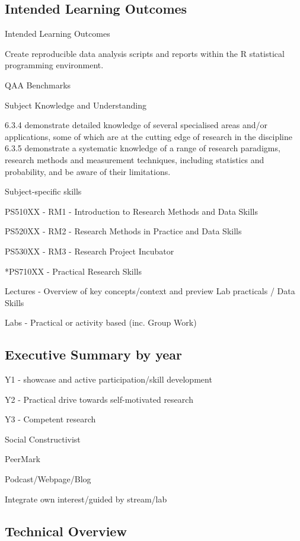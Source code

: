 \documentclass[
  11pt,
  letterpaper,
  oneside,
  open=any]{scrbook}
\begin{document}
\hypertarget{intended-learning-outcomes}{%
\subsection{Intended Learning
Outcomes}\label{intended-learning-outcomes}}

Intended Learning Outcomes

Create reproducible data analysis scripts and reports within the R
statistical programming environment.

QAA Benchmarks

Subject Knowledge and Understanding

6.3.4 demonstrate detailed knowledge of several specialised areas and/or
applications, some of which are at the cutting edge of research in the
discipline 6.3.5 demonstrate a systematic knowledge of a range of
research paradigms, research methods and measurement techniques,
including statistics and probability, and be aware of their limitations.

Subject-specific skills

PS510XX - RM1 - Introduction to Research Methods and Data Skills

PS520XX - RM2 - Research Methods in Practice and Data Skills

PS530XX - RM3 - Research Project Incubator

*PS710XX - Practical Research Skills

Lectures - Overview of key concepts/context and preview Lab practicals /
Data Skills

Labs - Practical or activity based (inc. Group Work)

\hypertarget{executive-summary-by-year}{%
\subsection{Executive Summary by year}\label{executive-summary-by-year}}

Y1 - showcase and active participation/skill development

Y2 - Practical drive towards self-motivated research

Y3 - Competent research

Social Constructivist

PeerMark

Podcast/Webpage/Blog

Integrate own interest/guided by stream/lab

\hypertarget{technical-overview}{%
\subsection{Technical Overview}\label{technical-overview}}
\end{document}
